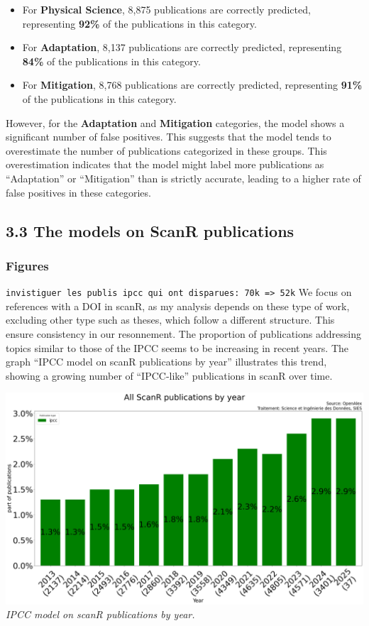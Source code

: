 \documentclass[
]{article}
\providecommand{\tightlist}{%
  \setlength{\itemsep}{0pt}\setlength{\parskip}{0pt}}
\begin{document}
\begin{itemize}
\tightlist
\item
  For \textbf{Physical Science}, 8,875 publications are correctly
  predicted, representing \textbf{92\%} of the publications in this
  category.
\item
  For \textbf{Adaptation}, 8,137 publications are correctly predicted,
  representing \textbf{84\%} of the publications in this category.
\item
  For \textbf{Mitigation}, 8,768 publications are correctly predicted,
  representing \textbf{91\%} of the publications in this category.
\end{itemize}

However, for the \textbf{Adaptation} and \textbf{Mitigation} categories,
the model shows a significant number of false positives. This suggests
that the model tends to overestimate the number of publications
categorized in these groups. This overestimation indicates that the
model might label more publications as ``Adaptation'' or ``Mitigation''
than is strictly accurate, leading to a higher rate of false positives
in these categories.

\hypertarget{the-models-on-scanr-publications}{%
\subsection{3.3 The models on ScanR
publications}\label{the-models-on-scanr-publications}}

\hypertarget{figures}{%
\subsubsection{Figures}\label{figures}}

\texttt{invistiguer\ les\ publis\ ipcc\ qui\ ont\ disparues:\ 70k\ =\textgreater{}\ 52k}
We focus on references with a DOI in scanR, as my analysis depends on
these type of work, excluding other type such as theses, which follow a
different structure. This ensure consistency in our resonnement. The
proportion of publications addressing topics similar to those of the
IPCC seems to be increasing in recent years. The graph ``IPCC model on
scanR publications by year'' illustrates this trend, showing a growing
number of ``IPCC-like'' publications in scanR over time.

\includegraphics{./images/teds_model_scanR1.png} \emph{IPCC model on
scanR publications by year.}
\end{document}
